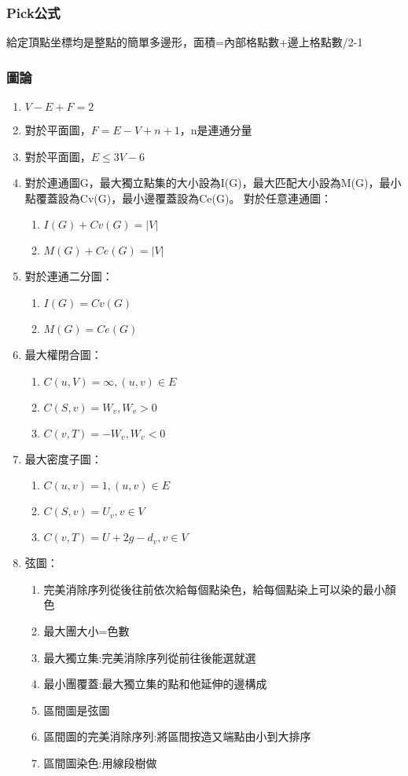 %

\subsubsection{Pick公式}
給定頂點坐標均是整點的簡單多邊形，面積=內部格點數+邊上格點數/2-1

\subsubsection{圖論}
\begin{enumerate}\itemsep = -5pt
\item $V-E+F=2$
\item 對於平面圖，$F=E-V+n+1$，n是連通分量
\item 對於平面圖，$E\leq 3V-6$
\item 對於連通圖G，最大獨立點集的大小設為I(G)，最大匹配大小設為M(G)，最小點覆蓋設為Cv(G)，最小邊覆蓋設為Ce(G)。
對於任意連通圖：
	\begin{enumerate}\itemsep = -3pt
	\item $I(G)+Cv(G)=|V|$
	\item $M(G)+Ce(G)=|V|$
	\end{enumerate}
\item 對於連通二分圖：
	\begin{enumerate}\itemsep = -3pt
	\item $I(G)=Cv(G)$
	\item $M(G)=Ce(G)$
	\end{enumerate}
\item 最大權閉合圖：
	\begin{enumerate}\itemsep = -3pt
	\item $C(u,V)=\infty ,(u,v)\in E$
	\item $C(S,v)=W_v ,W_v>0$
	\item $C(v,T)=-W_v ,W_v<0$
	\end{enumerate}
\item 最大密度子圖：
	\begin{enumerate}\itemsep = -3pt
	\item $C(u,v)=1 ,(u,v)\in E$
	\item $C(S,v)=U_v ,v \in V$
	\item $C(v,T)=U+2g-d_v ,v \in V$
	\end{enumerate}
\item 弦圖：
	\begin{enumerate}\itemsep = -3pt
	\item 完美消除序列從後往前依次給每個點染色，給每個點染上可以染的最小顏色
	\item 最大團大小=色數
	\item 最大獨立集:完美消除序列從前往後能選就選
	\item 最小團覆蓋:最大獨立集的點和他延伸的邊構成
	\item 區間圖是弦圖
	\item 區間圖的完美消除序列:將區間按造又端點由小到大排序
	\item 區間圖染色:用線段樹做
	\end{enumerate}
\end{enumerate}
